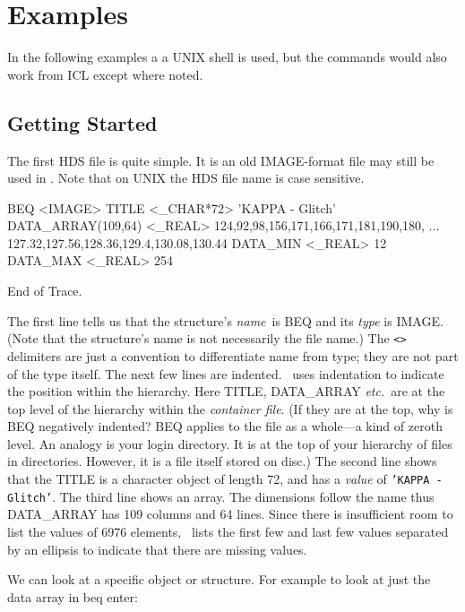 \documentclass[11pt,nolof]{starlink}
\begin{document}
\section{Examples}
\label{se:example}
In the following examples a a UNIX shell is used, but the commands would
also work from ICL except where noted.

\subsection{Getting Started}
The first HDS file is quite simple.  It is an old IMAGE-format file may
still be used in \KAPPAref.  Note that on UNIX the HDS file name is case sensitive.

\small
\begin{terminalv}

BEQ  <IMAGE>
  TITLE          <_CHAR*72>      'KAPPA - Glitch'
  DATA_ARRAY(109,64)  <_REAL>    124,92,98,156,171,166,171,181,190,180,
                                 ... 127.32,127.56,128.36,129.4,130.08,130.44
  DATA_MIN       <_REAL>         12
  DATA_MAX       <_REAL>         254

End of Trace.
\end{terminalv}
\normalsize
The first line tells us that the structure's \emph{name}\ is BEQ and its
\emph{type\/} is IMAGE.  (Note that the structure's name is not
necessarily the file name.)  The \texttt{<>} delimiters are just a
convention to differentiate name from type; they are not part of the
type itself.  The next few lines are indented.  \HDSTRACE\
uses indentation to indicate the position within the hierarchy.  Here
TITLE, DATA\_ARRAY \emph{etc.}\ are at the top level of the hierarchy
within the \emph{container file}.  (If they are at the top, why is BEQ
negatively indented?  BEQ applies to the file as a whole---a kind of
zeroth level. An analogy is your login directory.  It is at the top of
your hierarchy of files in directories.  However, it is a file itself
stored on disc.) The second line shows that the TITLE is a character
object of length 72, and has a \emph{value\/} of \texttt{'KAPPA - Glitch'}.
The third line shows an array.  The dimensions follow the name thus
DATA\_ARRAY has 109 columns and 64 lines.  Since there is insufficient
room to list the values of 6976 elements, \HDSTRACE\ lists
the first few and last few values separated by an ellipsis to indicate
that there are missing values.

We can look at a specific object or structure.  For example to look
at just the data array in beq enter:
\end{document}
